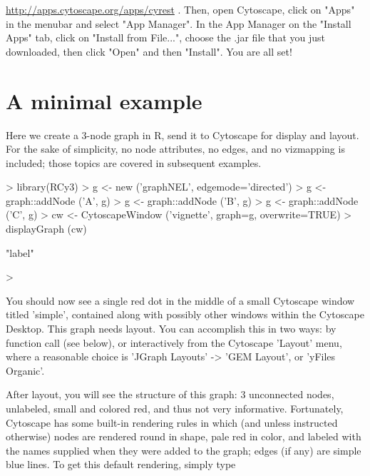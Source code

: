 \documentclass[12pt]{article}
\begin{document}
 \url{http://apps.cytoscape.org/apps/cyrest}\newline\newline
. Then, open Cytoscape, click on "Apps" in the menubar and select "App Manager". In the App Manager on the "Install Apps" tab, click on "Install from File...", choose the .jar file that you just downloaded, then click "Open" and then "Install". You are all set!


\section{A minimal example}

Here we create a 3-node graph in R, send it to Cytoscape for display and layout.  For the sake of simplicity, no node attributes, no edges, and no vizmapping is included; those topics are covered in subsequent examples.

\begin{Schunk}
\begin{Sinput}
>   library(RCy3)
>   g <- new ('graphNEL', edgemode='directed')
>   g <- graph::addNode ('A', g)
>   g <- graph::addNode ('B', g)
>   g <- graph::addNode ('C', g)
>   cw <- CytoscapeWindow ('vignette', graph=g, overwrite=TRUE)
>   displayGraph (cw)
\end{Sinput}
\begin{Soutput}
[1] "label"
\end{Soutput}
\begin{Sinput}
> 
\end{Sinput}
\end{Schunk}

You should now see a single red dot in the middle of a small Cytoscape window titled 'simple', contained along with possibly
other windows within the Cytoscape Desktop.  This graph needs layout.  You can accomplish this in two ways:  by function call (see below), or interactively from the Cytoscape 'Layout' menu, where a reasonable choice is 'JGraph Layouts' -> 'GEM Layout', or 'yFiles Organic'.

After layout, you will see the structure of this graph:  3 unconnected nodes, unlabeled, small and colored red, and thus not very informative.  Fortunately, Cytoscape has some built-in rendering rules in which (and unless instructed otherwise) nodes are rendered round in shape, pale red in color, and labeled with the names supplied when they were added to the graph;  edges (if any) are simple blue lines. To get this default rendering, simply type
\end{document}

